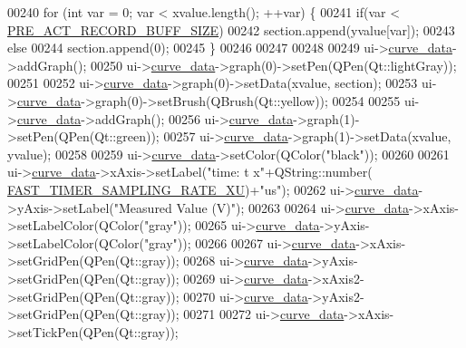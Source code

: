 \begin{DoxyCode}
00240     \textcolor{keywordflow}{for} (\textcolor{keywordtype}{int} var = 0; var < xvalue.length(); ++var) \{
00241         \textcolor{keywordflow}{if}(var < \hyperlink{a00003_a18dcecc16ded13fa622e0913e73442e6}{PRE\_ACT\_RECORD\_BUFF\_SIZE})
00242         section.append(yvalue[var]);
00243         \textcolor{keywordflow}{else}
00244         section.append(0);
00245     \}
00246 
00247 
00248 
00249     ui->\hyperlink{a00028_a247d94481323c0bc4f8b6458a8a535dd}{curve\_data}->addGraph();
00250     ui->\hyperlink{a00028_a247d94481323c0bc4f8b6458a8a535dd}{curve\_data}->graph(0)->setPen(QPen(Qt::lightGray));
00251 
00252     ui->\hyperlink{a00028_a247d94481323c0bc4f8b6458a8a535dd}{curve\_data}->graph(0)->setData(xvalue, section);
00253     ui->\hyperlink{a00028_a247d94481323c0bc4f8b6458a8a535dd}{curve\_data}->graph(0)->setBrush(QBrush(Qt::yellow));
00254 
00255     ui->\hyperlink{a00028_a247d94481323c0bc4f8b6458a8a535dd}{curve\_data}->addGraph();
00256     ui->\hyperlink{a00028_a247d94481323c0bc4f8b6458a8a535dd}{curve\_data}->graph(1)->setPen(QPen(Qt::green));
00257     ui->\hyperlink{a00028_a247d94481323c0bc4f8b6458a8a535dd}{curve\_data}->graph(1)->setData(xvalue, yvalue);
00258 
00259      ui->\hyperlink{a00028_a247d94481323c0bc4f8b6458a8a535dd}{curve\_data}->setColor(QColor(\textcolor{stringliteral}{"black"}));
00260 
00261     ui->\hyperlink{a00028_a247d94481323c0bc4f8b6458a8a535dd}{curve\_data}->xAxis->setLabel(\textcolor{stringliteral}{"time:  t x"}+QString::number(
      \hyperlink{a00031_a87ea9a0eaa474d8b8f672cfa5cbb091f}{FAST\_TIMER\_SAMPLING\_RATE\_XU})+\textcolor{stringliteral}{"us"});
00262     ui->\hyperlink{a00028_a247d94481323c0bc4f8b6458a8a535dd}{curve\_data}->yAxis->setLabel(\textcolor{stringliteral}{"Measured Value (V)"});
00263 
00264     ui->\hyperlink{a00028_a247d94481323c0bc4f8b6458a8a535dd}{curve\_data}->xAxis->setLabelColor(QColor(\textcolor{stringliteral}{"gray"}));
00265     ui->\hyperlink{a00028_a247d94481323c0bc4f8b6458a8a535dd}{curve\_data}->yAxis->setLabelColor(QColor(\textcolor{stringliteral}{"gray"}));
00266 
00267     ui->\hyperlink{a00028_a247d94481323c0bc4f8b6458a8a535dd}{curve\_data}->xAxis->setGridPen(QPen(Qt::gray));
00268     ui->\hyperlink{a00028_a247d94481323c0bc4f8b6458a8a535dd}{curve\_data}->yAxis->setGridPen(QPen(Qt::gray));
00269     ui->\hyperlink{a00028_a247d94481323c0bc4f8b6458a8a535dd}{curve\_data}->xAxis2->setGridPen(QPen(Qt::gray));
00270     ui->\hyperlink{a00028_a247d94481323c0bc4f8b6458a8a535dd}{curve\_data}->yAxis2->setGridPen(QPen(Qt::gray));
00271 
00272     ui->\hyperlink{a00028_a247d94481323c0bc4f8b6458a8a535dd}{curve\_data}->xAxis->setTickPen(QPen(Qt::gray));

\end{DoxyCode}
